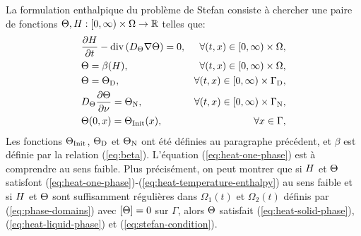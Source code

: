 La formulation enthalpique du problème de Stefan consiste à chercher
une paire de fonctions
$\Theta,H:[0,\infty)\times\Omega\to\mathbb R$
telles que:
\begin{align}
  & \frac{\partial \enthalpydensity}{\partial t} %
  - \div\parent{ \electrolytetdiff\nabla \temperature} = 0,%
  & \forall (t, x) \in [0,\infty)\times
    \Omega,\label{eq:heat-one-phase}\\
  & \temperature = \beta(\enthalpydensity),
    &\forall (t, x) \in [0,\infty)\times \Omega,\label{eq:heat-temperature-enthalpy}\\
  & \temperature = \temperature_\mathrm{D}, %
  & \forall (t, x) \in [0,\infty)\times \Gamma_\mathrm{D},\label{eq:heat-one-phase-dirichlet}\\
  & \electrolytetdiff\frac{\partial \temperature}{\partial \nu} = \temperature_\mathrm{N}, %
  & \forall (t, x) \in [0,\infty)\times \Gamma_\mathrm{N},\label{eq:heat-one-phase-neumann}\\
  & \temperature(0, x) = \tinit(x),
  & \forall x\in\Gamma,\label{eq:heat-initial-condition}
\end{align}
Les fonctions $\Theta_\text{Init}$, $\Theta_\mathrm{D}$ et
$\Theta_\mathrm{N}$ ont été définies au paragraphe précédent, et
$\beta$ est définie par la relation (\ref{eq:beta}). L'équation
(\ref{eq:heat-one-phase}) est à comprendre au sens faible. Plus
précisément, on peut montrer que si $H$ et
$\Theta$ satisfont
(\ref{eq:heat-one-phase})-(\ref{eq:heat-temperature-enthalpy}) au sens
faible et si
$H$ et $\Theta$ sont suffisamment régulières dans
$\Omega_1(t)$ et $\Omega_2(t)$ définis par (\ref{eq:phase-domains})
avec $\left[ \Theta \right] = 0$ sur $\Gamma$,
alors $\Theta$ satisfait (\ref{eq:heat-solid-phase}),
(\ref{eq:heat-liquid-phase}) et (\ref{eq:stefan-condition}).


